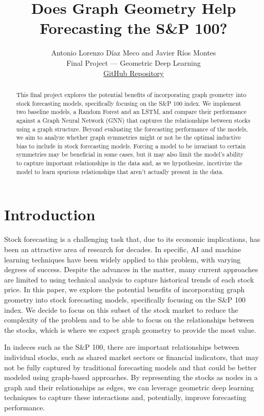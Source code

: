 \documentclass{article}
\title{Does Graph Geometry Help Forecasting the S\&P 100?}
\author{
Antonio Lorenzo Díaz Meco and Javier Ríos Montes \\
Final Project --- Geometric Deep Learning \\
\href{https://github.com/Javirios03/sp100-graph-forecasting}{GitHub Repository}
}
\begin{document}
\maketitle

\begin{abstract}
    This final project explores the potential benefits of incorporating graph geometry into stock forecasting models, specifically focusing on the S\&P 100 index. We implement two baseline models, a Random Forest and an LSTM, and compare their performance against a Graph Neural Network (GNN) that captures the relationships between stocks using a graph structure. Beyond evaluating the forecasting performance of the models, we aim to analyze whether graph symmetries might or not be the optimal inductive bias to include in stock forecasting models. Forcing a model to be invariant to certain symmetries may be beneficial in some cases, but it may also limit the model's ability to capture important relationships in the data and, as we hypothesize, incetivize the model to learn spurious relationships that aren't actually present in the data.
\end{abstract}

\section{Introduction}

Stock forecasting is a challenging task that, due to its economic implications, has been an attractive area of research for decades. In specific, AI and machine learning techniques have been widely applied to this problem, with varying degrees of success. Despite the advances in the matter, many current approaches are limited to using technical analysis to capture historical trends of each stock price. In this paper, we explore the potential benefits of incorporating graph geometry into stock forecasting models, specifically focusing on the S\&P 100 index. We decide to focus on this subset of the stock market to reduce the complexity of the problem and to be able to focus on the relationships between the stocks, which is where we expect graph geometry to provide the most value.

In indeces such as the S\&P 100, there are important relationships between individual stocks, such as shared market sectors or financial indicators, that may not be fully captured by traditional forecasting models and that could be better modeled using graph-based approaches. By representing the stocks as nodes in a graph and their relationships as edges, we can leverage geometric deep learning techniques to capture these interactions and, potentially, improve forecasting performance.
\end{document}
